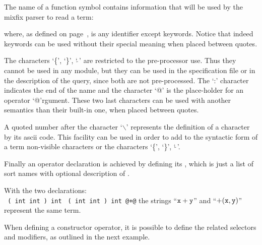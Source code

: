 


The name of a function symbol contains information that will be used
by the mixfix parser to read a term:

 {}
where, as defined on page~\pageref{elan id},  is
any identifier except keywords. Notice that indeed keywords can be
used without their special meaning when placed between quotes.

The characters 
`\{', `\}', `$\tilde{\ }$'
are restricted to the pre-processor use. Thus they cannot be used in
any module, but they can be used in the specification file or in the
description of the query, since both are not pre-processed.
The  `:' character indicates the end of the name and the character `@'
is the place-holder for an operator `@'rgument. These two last
characters can be used with another semantics than their built-in one,
when placed between quotes.

A quoted number after the character `$\backslash$' represents the
definition of a character by its ascii code. This facility can be used
in order to add to the syntactic form of a term non-visible characters
or the characters `\{', `\}', `$\tilde{\ }$'.

Finally an operator declaration is achieved by defining
its , which is just a list of sort names with optional
description of .


\EX With the two declarations:\\
{\tt {}     {( int int ) int}{}}
{\tt {}  {( int int ) int}{}     {@+@}}
the strings ``$\tt x+y$'' and ``$\tt +(x,y)$'' represent the same
term.
\FEX

When defining a constructor operator, it is possible to define the
related selectors and modifiers, as outlined in the next example.

